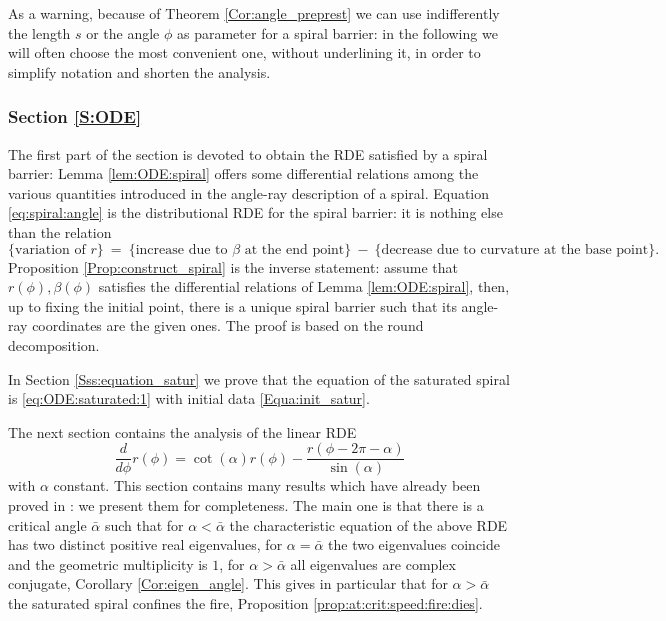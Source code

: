 \documentclass[reqno]{amsart}
\newcounter{assu}
\theoremstyle{definition} \newtheorem{definition}{Definition}[section]
\theoremstyle{definition} \newtheorem{remark}[definition]{Remark}
\theoremstyle{plain} \newtheorem{lemma}[definition]{Lemma}
\theoremstyle{plain} \newtheorem{proposition}[definition]{Proposition}
\theoremstyle{plain} \newtheorem{theorem}[definition]{Theorem}
\theoremstyle{plain} \newtheorem{corollary}[definition]{Corollary}
\theoremstyle{definition} \newtheorem{example}[definition]{Example}
\theoremstyle{plain} \newtheorem{claim}[clai]{Claim}
\theoremstyle{definition} \newtheorem{assumption}[definition]{Assumption}
\theoremstyle{definition} \newtheorem{observation}[definition]{Observation}
\newcommand{\1}{\mathbbm 1}
\numberwithin{equation}{section} %
\theoremstyle{plain} \newtheorem*{theorem*}{Theorem}
\theoremstyle{plain} \newtheorem{mthm}[maintheorem]{Main Theorem}
\theoremstyle{plain} \newtheorem*{mthm*}{Main Theorem}
\theoremstyle{plain} \newtheorem*{conjecture*}{Conjecture}
\theoremstyle{plain} \newtheorem{conjecture}[definition]{Conjecture}
\theoremstyle{plain} \newtheorem*{problem*}{Problem}
\begin{document}
As a warning, because of Theorem \ref{Cor:angle_preprest} we can use indifferently the length $s$ or the angle $\phi$ as parameter for a spiral barrier: in the following we will often choose the most convenient one, without underlining it, in order to simplify notation and shorten the analysis.


\subsubsection{Section \ref{S:ODE}}
\label{Sss:ODE_intro}


The first part of the section is devoted to obtain the RDE satisfied by a spiral barrier: Lemma \ref{lem:ODE:spiral} offers some differential relations among the various quantities introduced in the angle-ray description of a spiral. Equation \eqref{eq:spiral:angle} is the distributional RDE for the spiral barrier: it is nothing else than the relation
\begin{equation*}
\big\{ \text{variation of $r$} \big\} \ = \ \big\{ \text{increase due to $\beta$ at the end point} \big\} \ - \ \big\{ \text{decrease due to curvature at the base point} \big\}.
\end{equation*}
Proposition \ref{Prop:construct_spiral} is the inverse statement: assume that $r(\phi),\beta(\phi)$ satisfies the differential relations of Lemma \ref{lem:ODE:spiral}, then, up to fixing the initial point, there is a unique spiral barrier such that its angle-ray coordinates are the given ones. The proof is based on the round decomposition.

In Section \ref{Sss:equation_satur} we prove that the equation of the saturated spiral is \eqref{eq:ODE:saturated:1} with initial data \eqref{Equa:init_satur}.

The next section contains the analysis of the linear RDE
\begin{equation}
\label{Equa:satur_spiral_intro}
\frac{d}{d\phi} r(\phi) = \cot(\alpha) r(\phi) - \frac{r(\phi - 2\pi - \alpha)}{\sin(\alpha)}
\end{equation}
with $\alpha$ constant. This section contains many results which have already been proved in \cite{firefighter}: we present them for completeness. The main one is that there is a critical angle $\bar \alpha$ such that for $\alpha < \bar \alpha$ the characteristic equation of the above RDE has two distinct positive real eigenvalues, for $\alpha = \bar \alpha$ the two eigenvalues coincide and the geometric multiplicity is $1$, for $\alpha > \bar \alpha$ all eigenvalues are complex conjugate, Corollary \ref{Cor:eigen_angle}. This gives in particular that for $\alpha > \bar \alpha$ the saturated spiral confines the fire, Proposition \ref{prop:at:crit:speed:fire:dies}.
\end{document}
